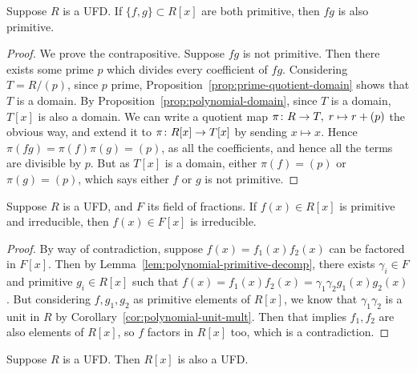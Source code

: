 \begin{lemma}\label{lem:gauss}
    Suppose \(R\) is a UFD.\@
    If \(\{f,g\} \subset R[x]\) are both primitive,
    then \(fg\) is also primitive.
\end{lemma}
\begin{proof}
    We prove the contrapositive.
    Suppose \(fg\) is not primitive.
    Then there exists some prime \(p\) which divides every coefficient of \(fg\).
    Considering \(T = R/(p)\), since \(p\) prime,
    Proposition~\ref{prop:prime-quotient-domain} shows that \(T\) is a domain.
    By Proposition~\ref{prop:polynomial-domain},
    since \(T\) is a domain, \(T[x]\) is also a domain.
    We can write a quotient map \(\pi\colon R\to T,\;r\mapsto r+(p)\) the obvious way,
    and extend it to \(\pi\colon R[x]\to T[x]\) by sending \(x \mapsto x\).
    Hence \(\pi(fg) = \pi(f)\pi(g) = (p)\),
    as all the coefficients, and hence all the terms are divisible by \(p\).
    But as \(T[x]\) is a domain, either \(\pi(f) = (p)\) or \(\pi(g) = (p)\),
    which says either \(f\) or \(g\) is not primitive.
\end{proof}
\begin{lemma}\label{lem:polynomial-primitive-irreducible}
    Suppose \(R\) is a UFD, and \(F\) its field of fractions.
    If \(f(x) \in R[x]\) is primitive and irreducible,
    then \(f(x) \in F[x]\) is irreducible.
\end{lemma}
\begin{proof}
    By way of contradiction, suppose \(f(x) = f_1(x)f_2(x)\)
    can be factored in \(F[x]\).
    Then by Lemma~\ref{lem:polynomial-primitive-decomp},
    there exists \(\gamma_i \in F\) and primitive \(g_i \in R[x]\)
    such that \(f(x) = f_1(x)f_2(x) = \gamma_1\gamma_2 g_1(x)g_2(x)\).
    But considering \(f,g_1,g_2\) as primitive elements of \(R[x]\),
    we know that \(\gamma_1\gamma_2\) is a unit in \(R\)
    by Corollary~\ref{cor:polynomial-unit-mult}.
    Then that implies \(f_1,f_2\) are also elements of \(R[x]\),
    so \(f\) factors in \(R[x]\) too,
    which is a contradiction.
\end{proof}
\begin{theorem}
    Suppose \(R\) is a UFD.\@
    Then \(R[x]\) is also a UFD.\@
\end{theorem}

